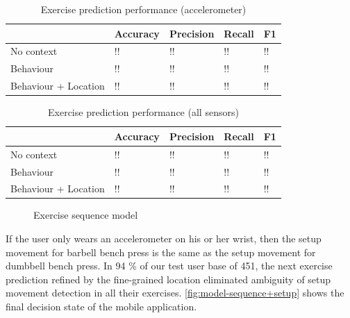 \documentclass[a4paper, 10 pt, conference]{IEEEtran}
\begin{document}
\begin{table}[h]
\caption{Exercise prediction performance (accelerometer)}
\label{tbl:setup-movement-performance-accelerometer}
\begin{center}
\begin{tabular}{|l||m{1cm}|m{1cm}|m{1cm}|m{1cm}|}
\hline            			& Accuracy & Precision & Recall & F1 \\
\hline No context 			& !!       & !!        & !!     & !! \\
\hline Behaviour  			& !!       & !!        & !!     & !! \\ 
\hline Behaviour + Location & !!       & !!        & !!     & !! \\
\hline
\end{tabular}
\end{center}
\end{table}

\begin{table}[h]
\caption{Exercise prediction performance (all sensors)}
\label{tbl:setup-movement-performance-all}
\begin{center}
\begin{tabular}{|l||m{1cm}|m{1cm}|m{1cm}|m{1cm}|}
\hline            			& Accuracy & Precision & Recall & F1 \\
\hline No context 			& !!       & !!        & !!     & !! \\
\hline Behaviour  			& !!       & !!        & !!     & !! \\ 
\hline Behaviour + Location & !!       & !!        & !!     & !! \\
\hline
\end{tabular}
\end{center}
\end{table}

\begin{figure}[hb]
	\begin{center}
		\caption{Exercise sequence model}
		\label{fig:model-sss}
	\end{center}
\end{figure}


If the user only wears an accelerometer on his or her wrist, then the setup movement for barbell bench press is the same as the setup movement for dumbbell bench press. In 94 \% of our test user base of 451, the next exercise prediction refined by the fine-grained location eliminated ambiguity of setup movement detection in all their exercises. \autoref{fig:model-sequence+setup} shows the final decision state of the mobile application.
\end{document}
